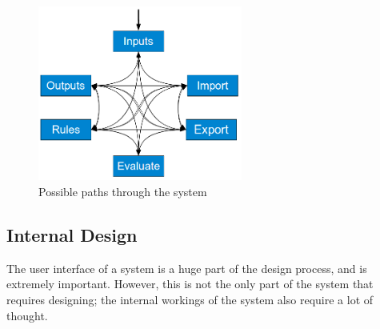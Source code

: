 \begin{figure}[ht!]
\begin{center}
\includegraphics[width=0.6\textwidth]{images/web}
\end{center}
\caption{Possible paths through the system}
\label{fig:webThrough}
\end{figure}

\subsection{Internal Design}
The user interface of a system is a huge part of the design process, and is extremely important. However, this is not the only part of the system that requires designing; the internal workings of the system also require a lot of thought. 
